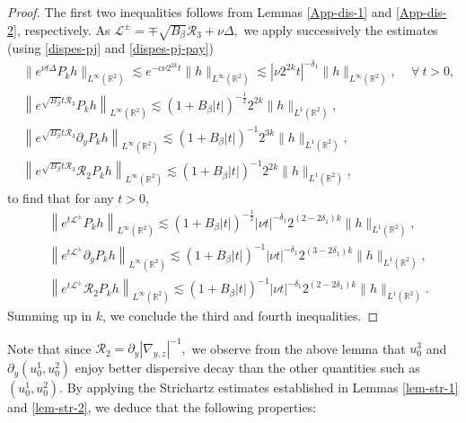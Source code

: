 \documentclass[11pt,reqno]{article}
\numberwithin{equation}{section}
\newcommand\R{{\mathbb R}}
\let\pa=\partial
\let\f=\frac
\def \cR {\mathcal{R}}
\begin{document}
\begin{proof}%
The first  two  inequalities follows from Lemmas \ref{App-dis-1} and \ref{App-dis-2}, respectively. 
As $\mathcal{L}^{\pm}=\mp \sqrt{B_{\beta}} \mathcal{R}_3+\nu\Delta ,$ we apply successively the estimates 
(using \eqref{dispes-pj} and \eqref{dispes-pj-pay})
\begin{align*}
&  \|  e^{\nu t\Delta}P_k h\|_{L^{\infty}(\R^2)} \lesssim e^{-c\nu 2^{2k}t}\|h\|_{L^{\infty}(\R^2)}\lesssim |\nu 2^{2k} t|^{-\delta_1}\|h\|_{L^{\infty}(\R^2)}, \, \quad \forall~ t>0,\\
& \left\|e^{\sqrt{B_{\beta}}t \mathcal{R}_3}  {P_k} h\right\|_{L^{\infty}(\R^2)} \lesssim (1+B_{\beta}|t|)^{-\f12}  2^{2 k}\|h\|_{L^{1}(\R^2)},\\
&\left\|e^{\sqrt{B_{\beta}}t \mathcal{R}_3} \partial_y {P_k} h\right\|_{L^{\infty}(\R^2)} \lesssim (1+B_{\beta}|t|)^{-1}  2^{3 k}\|h\|_{L^{1}(\R^2)},\\
&\left\|e^{\sqrt{B_{\beta}}t \mathcal{R}_3}\mathcal{R}_2 {P_k} h\right\|_{L^{\infty}(\R^2)} \lesssim (1+B_{\beta}|t|)^{-1}  2^{2 k}\|h\|_{L^{1}(\R^2)},
\end{align*}
to find that for any $t> 0,$
\begin{align*} 
& \left\|e^{t\mathcal{L}^{\pm}}  {P_k} h\right\|_{L^{\infty}(\R^2)} \lesssim (1+B_{\beta}|t|)^{-\f12} |\nu  t|^{-\delta_1} 2^{(2-2\delta_1) k}\|h\|_{L^{1}(\R^2)},\\
&\left\|e^{t\mathcal{L}^{\pm}} \partial_y {P_k} h\right\|_{L^{\infty}(\R^2)} \lesssim (1+B_{\beta}|t|)^{-1}  |\nu  t|^{-\delta_1} 2^{(3-2\delta_1) k}\|h\|_{L^{1}(\R^2)},\\
&\left\|e^{t\mathcal{L}^{\pm}}\mathcal{R}_2 {P_k} h\right\|_{L^{\infty}(\R^2)} \lesssim (1+B_{\beta}|t|)^{-1}  |\nu  t|^{-\delta_1} 2^{(2-2\delta_1) k}\|h\|_{L^{1}(\R^2)}.
\end{align*}
Summing up in $k$, we conclude the third and fourth inequalities.
\end{proof}
Note that since $\cR_2=\pa_y|\nabla_{y,z}|^{-1},$ 
we observe from the above lemma  that $u_0^3$ and $\pa_y (u_0^1, u_0^2)$ enjoy better dispersive decay than the other quantities such as $(u_0^1, u_0^2).$
By applying %
the Strichartz estimates established in Lemmas \ref{lem-str-1} and \ref{lem-str-2}, we deduce that the following properties:
\end{document}
